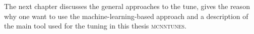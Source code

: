 
\medskip

The next chapter discusses the general approaches to the tune, gives the reason why one want to use the machine-learning-based approach and a description of the main tool used for the tuning in this thesis \textsc{mcnntunes}. 
